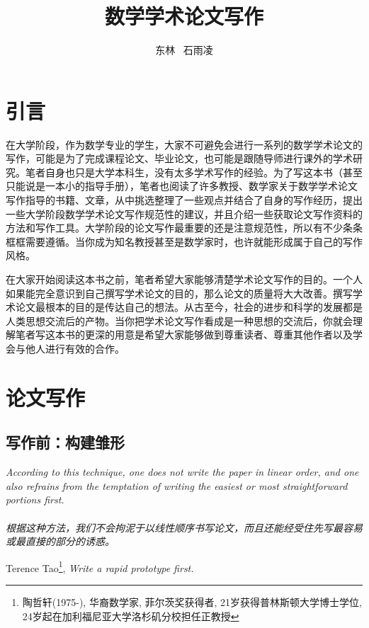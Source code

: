 \documentclass{formatBook}
\begin{document}
\title{数学学术论文写作}
\author{东林 \ 石雨凌}
\maketitle
\tableofcontents

\newpage
\chapter{引言}
在大学阶段，作为数学专业的学生，大家不可避免会进行一系列的数学学术论文的写作，可能是为了完成课程论文、毕业论文，也可能是跟随导师进行课外的学术研究。笔者自身也只是大学本科生，没有太多学术写作的经验。为了写这本书（甚至只能说是一本小的指导手册），笔者也阅读了许多教授、数学家关于数学学术论文写作指导的书籍、文章，从中挑选整理了一些观点并结合了自身的写作经历，提出一些大学阶段数学学术论文写作规范性的建议，并且介绍一些获取论文写作资料的方法和写作工具。大学阶段的论文写作最重要的还是注意规范性，所以有不少条条框框需要遵循。当你成为知名教授甚至是数学家时，也许就能形成属于自己的写作风格。

\par 在大家开始阅读这本书之前，笔者希望大家能够清楚学术论文写作的目的。一个人如果能完全意识到自己撰写学术论文的目的，那么论文的质量将大大改善。撰写学术论文最根本的目的是传达自己的想法。从古至今，社会的进步和科学的发展都是人类思想交流后的产物。当你把学术论文写作看成是一种思想的交流后，你就会理解笔者写这本书的更深的用意是希望大家能够做到尊重读者、尊重其他作者以及学会与他人进行有效的合作。

\chapter{论文写作}
\section{写作前：构建雏形}
\noindent \textit{According to this technique, one does not write the paper in linear order, and one also refrains from the temptation of writing the easiest or most straightforward portions first. \\ \ \\ 根据这种方法，我们不会拘泥于以线性顺序书写论文，而且还能经受住先写最容易或最直接的部分的诱惑。}
\begin{flushright}
    \cndash Terence Tao\footnote{陶哲轩(1975-), 华裔数学家, 菲尔茨奖获得者, 21岁获得普林斯顿大学博士学位,  24岁起在加利福尼亚大学洛杉矶分校担任正教授}, \textit{Write a rapid prototype first\cite{tao_write_2007}.}
\end{flushright}
\end{document}
